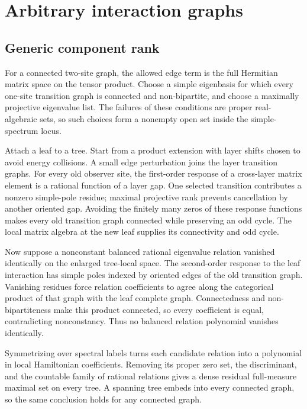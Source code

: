 \section{Arbitrary interaction graphs}

\subsection{Generic component rank}

For a connected two-site graph, the allowed edge term is the full Hermitian
matrix space on the tensor product.  Choose a simple eigenbasis for which
every one-site transition graph is connected and non-bipartite, and choose a
maximally projective eigenvalue list.  The failures of these conditions are
proper real-algebraic sets, so such choices form a nonempty open set inside
the simple-spectrum locus.

Attach a leaf to a tree.  Start from a product extension with layer shifts
chosen to avoid energy collisions.  A small edge perturbation joins the
layer transition graphs.  For every old observer site, the first-order
response of a cross-layer matrix element is a rational function of a layer
gap.  One selected transition contributes a nonzero simple-pole residue;
maximal projective rank prevents cancellation by another oriented gap.
Avoiding the finitely many zeros of these response functions makes every old
transition graph connected while preserving an odd cycle.  The local
matrix algebra at the new leaf supplies its connectivity and odd cycle.

Now suppose a nonconstant balanced rational eigenvalue relation vanished
identically on the enlarged tree-local space.  The second-order response to
the leaf interaction has simple poles indexed by oriented edges of the old
transition graph.  Vanishing residues force relation coefficients to agree
along the categorical product of that graph with the leaf complete graph.
Connectedness and non-bipartiteness make this product connected, so every
coefficient is equal, contradicting nonconstancy.  Thus no balanced relation
polynomial vanishes identically.

Symmetrizing over spectral labels turns each candidate relation into a
polynomial in local Hamiltonian coefficients.  Removing its proper zero set,
the discriminant, and the countable family of rational relations gives a
dense residual full-measure maximal set on every tree.  A spanning tree
embeds into every connected graph, so the same conclusion holds for any
connected graph.

